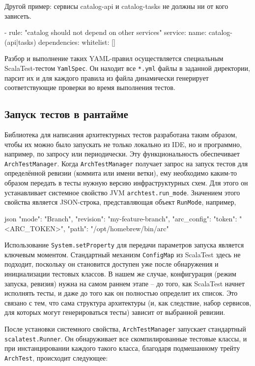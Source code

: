 Другой пример: сервисы catalog-api и catalog-tasks не должны ни от кого зависеть.

\begin{nocode}
- rule: "catalog should not depend on other services"
  service:
    name: catalog-(api|tasks)
  dependencies:
    whitelist: []
\end{nocode}

Разбор и выполнение таких YAML-правил осуществляется специальным ScalaTest-тестом \verb|YamlSpec|. Он находит все \verb|*.yml| файлы в заданной директории, парсит их и для каждого правила из файла динамически генерирует соответствующие проверки во время выполнения тестов.

\subsection{Запуск тестов в рантайме}

Библиотека для написания архитектурных тестов разработана таким образом, чтобы их можно было запускать не только локально из IDE, но и программно, например, по запросу или периодически. Эту функциональность обеспечивает \verb|ArchTestManager|. Когда \verb|ArchTestManager| получает запрос на запуск тестов для определённой ревизии (коммита или имени ветки), ему необходимо каким-то образом передать в тесты нужную версию инфраструктурных схем. Для этого он устанавливает системное свойство JVM \verb|archtest.run_mode|. Значением этого свойства является JSON-строка, представляющая объект \verb|RunMode|, например,

\begin{zerocode}{json}
{
    "mode": "Branch",
    "revision": "my-feature-branch",
    "arc_config": {
        "token": "<ARC_TOKEN>",
        "path": "/opt/homebrew/bin/arc"
    }
}
\end{zerocode}

Использование \verb|System.setProperty| для передачи параметров запуска является ключевым моментом. Стандартный механизм \verb|ConfigMap| из ScalaTest здесь не подходит, поскольку он становится доступен уже после обнаружения и инициализации тестовых классов. В нашем же случае, конфигурация (режим запуска, ревизия) нужна на самом раннем этапе – до того, как ScalaTest начнет исполнять тесты, и даже до того как он полностью определит их список. Это связано с тем, что сама структура архитектуры (и, как следствие, набор сервисов, для которых могут генерироваться тесты) зависит от выбранной ревизии.

После установки системного свойства, \verb|ArchTestManager| запускает стандартный \verb|scalatest.Runner|. Он обнаруживает все скомпилированные тестовые классы, и при инстанцировании каждого такого класса, благодаря подмешанному трейту \verb|ArchTest|, происходит следующее:


